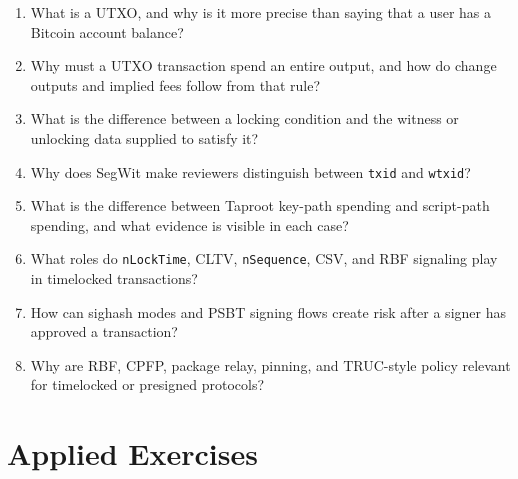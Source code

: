 \begin{enumerate}
\item What is a UTXO, and why is it more precise than saying that a user has a Bitcoin account balance?
\item Why must a UTXO transaction spend an entire output, and how do change outputs and implied fees follow from that rule?
\item What is the difference between a locking condition and the witness or unlocking data supplied to satisfy it?
\item Why does SegWit make reviewers distinguish between \texttt{txid} and \texttt{wtxid}?
\item What is the difference between Taproot key-path spending and script-path spending, and what evidence is visible in each case?
\item What roles do \texttt{nLockTime}, CLTV, \texttt{nSequence}, CSV, and RBF signaling play in timelocked transactions?
\item How can sighash modes and PSBT signing flows create risk after a signer has approved a transaction?
\item Why are RBF, CPFP, package relay, pinning, and TRUC-style policy relevant for timelocked or presigned protocols?
\end{enumerate}

\section*{Applied Exercises}

